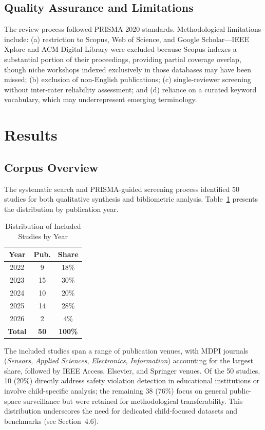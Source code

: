 \documentclass[conference]{IEEEtran}
\begin{document}
\subsection{Quality Assurance and Limitations}

The review process followed PRISMA 2020 standards. Methodological limitations include: (a) restriction to Scopus, Web of Science, and Google Scholar---IEEE Xplore and ACM Digital Library were excluded because Scopus indexes a substantial portion of their proceedings, providing partial coverage overlap, though niche workshops indexed exclusively in those databases may have been missed; (b) exclusion of non-English publications; (c) single-reviewer screening without inter-rater reliability assessment; and (d) reliance on a curated keyword vocabulary, which may underrepresent emerging terminology.

\section{Results}

\subsection{Corpus Overview}

The systematic search and PRISMA-guided screening process identified 50 studies for both qualitative synthesis and bibliometric analysis. Table~\ref{tab:years} presents the distribution by publication year.

\begin{table}[t]
\caption{Distribution of Included Studies by Year}
\begin{center}
\renewcommand{\arraystretch}{1.0}
\begin{tabular}{|c|c|c|}
\hline
\textbf{Year} & \textbf{Pub.} & \textbf{Share} \\
\hline
2022 & 9 & 18\% \\
2023 & 15 & 30\% \\
2024 & 10 & 20\% \\
2025 & 14 & 28\% \\
2026 & 2 & 4\% \\
\hline
\textbf{Total} & \textbf{50} & \textbf{100\%} \\
\hline
\end{tabular}
\label{tab:years}
\end{center}
\end{table}

The included studies span a range of publication venues, with MDPI journals (\textit{Sensors}, \textit{Applied Sciences}, \textit{Electronics}, \textit{Information}) accounting for the largest share, followed by IEEE Access, Elsevier, and Springer venues. Of the 50 studies, 10 (20\%) directly address safety violation detection in educational institutions or involve child-specific analysis; the remaining 38 (76\%) focus on general public-space surveillance but were retained for methodological transferability. This distribution underscores the need for dedicated child-focused datasets and benchmarks (see Section~4.6).
\end{document}
